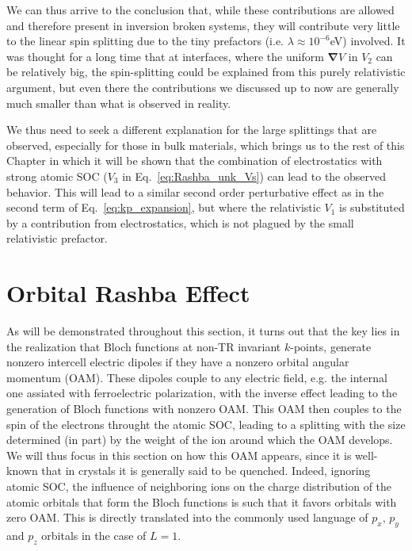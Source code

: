 We can thus arrive to the conclusion that, while these contributions are allowed and therefore present in inversion broken systems, they will contribute very little to the linear spin splitting due to the tiny prefactors (i.e. $\lambda \approx 10^{-6}$eV) involved.
It was thought for a long time that at interfaces, where the uniform $\bm{\nabla}V$ in $V_2$ can be relatively big, the spin-splitting could be explained from this purely relativistic argument, but even there the contributions we discussed up to now are generally much smaller than what is observed in reality. 

We thus need to seek a different explanation for the large splittings that are observed, especially for those in bulk materials, which brings us to the rest of this Chapter in which it will be shown that the combination of electrostatics with strong atomic SOC ($V_3$ in Eq.~\ref{eq:Rashba_unk_Vs}) can lead to the observed behavior.
This will lead to a similar second order perturbative effect as in the second term of Eq.~\ref{eq:kp_expansion}, but where the relativistic $V_1$ is substituted by a contribution from electrostatics, which is not plagued by the small relativistic prefactor.

\section{Orbital Rashba Effect}

As will be demonstrated throughout this section, it turns out that the key lies in the realization that Bloch functions at non-TR invariant $k$-points, generate nonzero intercell electric dipoles if they have a nonzero orbital angular momentum (OAM)\cite{Petersen2000,Park2011,Go2016}.
These dipoles couple to any electric field, e.g. the internal one assiated with ferroelectric polarization, with the inverse effect leading to the generation of Bloch functions with nonzero OAM.
This OAM then couples to the spin of the electrons throught the atomic SOC, leading to a splitting with the size determined (in part) by the weight of the ion around which the OAM develops.
We will thus focus in this section on how this OAM appears, since it is well-known that in crystals it is generally said to be quenched.
Indeed, ignoring atomic SOC, the influence of neighboring ions on the charge distribution of the atomic orbitals that form the Bloch functions is such that it favors orbitals with zero OAM.
This is directly translated into the commonly used language of $p_x$, $p_y$ and $p_z$ orbitals in the case of $L=1$.

